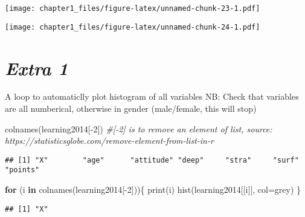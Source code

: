 \documentclass[
]{article}
\newenvironment{Shaded}{\begin{snugshade}}{\end{snugshade}}
\newcommand{\AttributeTok}[1]{\textcolor[rgb]{0.77,0.63,0.00}{#1}}
\newcommand{\CommentTok}[1]{\textcolor[rgb]{0.56,0.35,0.01}{\textit{#1}}}
\newcommand{\ControlFlowTok}[1]{\textcolor[rgb]{0.13,0.29,0.53}{\textbf{#1}}}
\newcommand{\DecValTok}[1]{\textcolor[rgb]{0.00,0.00,0.81}{#1}}
\newcommand{\FunctionTok}[1]{\textcolor[rgb]{0.00,0.00,0.00}{#1}}
\newcommand{\NormalTok}[1]{#1}
\newcommand{\SpecialCharTok}[1]{\textcolor[rgb]{0.00,0.00,0.00}{#1}}
\newcommand{\StringTok}[1]{\textcolor[rgb]{0.31,0.60,0.02}{#1}}
\begin{document}
\texttt{[image: chapter1\_files/figure-latex/unnamed-chunk-23-1.pdf]}

\begin{Shaded}
\end{Shaded}

\texttt{[image: chapter1\_files/figure-latex/unnamed-chunk-24-1.pdf]}

\hypertarget{extra-1}{%
\section{\texorpdfstring{\emph{Extra 1 }}{Extra 1 }}\label{extra-1}}

A loop to automaticlly plot histogram of all variables NB: Check that
variables are all numberical, otherwise in gender (male/female, this
will stop)

\begin{Shaded}
\begin{Highlighting}[]
\FunctionTok{colnames}\NormalTok{(learning2014[}\SpecialCharTok{{-}}\DecValTok{2}\NormalTok{]) }\CommentTok{\#[{-}2] is to remove an element of list, source: https://statisticsglobe.com/remove{-}element{-}from{-}list{-}in{-}r}
\end{Highlighting}
\end{Shaded}

\begin{verbatim}
## [1] "X"        "age"      "attitude" "deep"     "stra"     "surf"     "points"
\end{verbatim}

\begin{Shaded}
\begin{Highlighting}[]
\ControlFlowTok{for}\NormalTok{ (i }\ControlFlowTok{in} \FunctionTok{colnames}\NormalTok{(learning2014[}\SpecialCharTok{{-}}\DecValTok{2}\NormalTok{]))\{}
  \FunctionTok{print}\NormalTok{(i)}
  \FunctionTok{hist}\NormalTok{(learning2014[[i]], }\AttributeTok{col=}\StringTok{\textquotesingle{}grey\textquotesingle{}}\NormalTok{)}
\NormalTok{\}}
\end{Highlighting}
\end{Shaded}

\begin{verbatim}
## [1] "X"
\end{verbatim}
\end{document}
